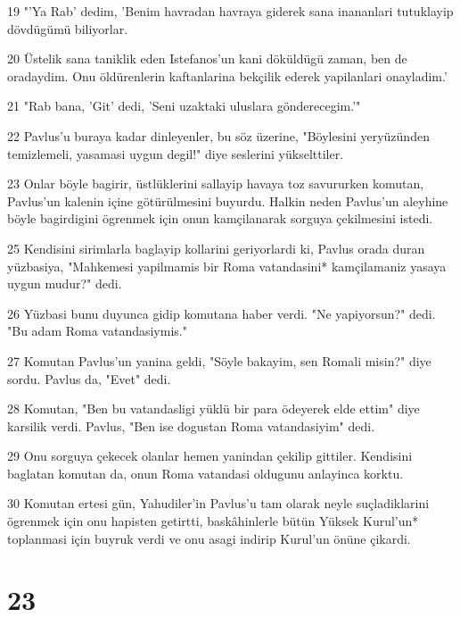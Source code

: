 \par 19 "'Ya Rab' dedim, 'Benim havradan havraya giderek sana inananlari tutuklayip dövdügümü biliyorlar.
\par 20 Üstelik sana taniklik eden Istefanos'un kani döküldügü zaman, ben de oradaydim. Onu öldürenlerin kaftanlarina bekçilik ederek yapilanlari onayladim.'
\par 21 "Rab bana, 'Git' dedi, 'Seni uzaktaki uluslara gönderecegim.'"
\par 22 Pavlus'u buraya kadar dinleyenler, bu söz üzerine, "Böylesini yeryüzünden temizlemeli, yasamasi uygun degil!" diye seslerini yükselttiler.
\par 23 Onlar böyle bagirir, üstlüklerini sallayip havaya toz savururken komutan, Pavlus'un kalenin içine götürülmesini buyurdu. Halkin neden Pavlus'un aleyhine böyle bagirdigini ögrenmek için onun kamçilanarak sorguya çekilmesini istedi.
\par 25 Kendisini sirimlarla baglayip kollarini geriyorlardi ki, Pavlus orada duran yüzbasiya, "Mahkemesi yapilmamis bir Roma vatandasini* kamçilamaniz yasaya uygun mudur?" dedi.
\par 26 Yüzbasi bunu duyunca gidip komutana haber verdi. "Ne yapiyorsun?" dedi. "Bu adam Roma vatandasiymis."
\par 27 Komutan Pavlus'un yanina geldi, "Söyle bakayim, sen Romali misin?" diye sordu. Pavlus da, "Evet" dedi.
\par 28 Komutan, "Ben bu vatandasligi yüklü bir para ödeyerek elde ettim" diye karsilik verdi. Pavlus, "Ben ise dogustan Roma vatandasiyim" dedi.
\par 29 Onu sorguya çekecek olanlar hemen yanindan çekilip gittiler. Kendisini baglatan komutan da, onun Roma vatandasi oldugunu anlayinca korktu.
\par 30 Komutan ertesi gün, Yahudiler'in Pavlus'u tam olarak neyle suçladiklarini ögrenmek için onu hapisten getirtti, baskâhinlerle bütün Yüksek Kurul'un* toplanmasi için buyruk verdi ve onu asagi indirip Kurul'un önüne çikardi.

\chapter{23}

